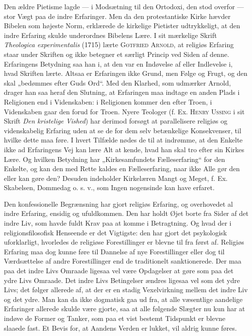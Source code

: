 \documentclass[12pt,a4paper,openany]{book}
\newcommand{\opage}[1]{\marginnote{\footnotesize\textit{[#1]}}}
\begin{document}
Den ældre Pietisme lagde --- i Modsætning til den Ortodoxi, den stod
overfor --- stor Vægt paa de indre Erfaringer. Men da den protestantiske
Kirke hævder Bibelen som højeste Norm, erklærede de kirkelige Pietister
udtrykkeligt, at den indre Erfaring skulde underordnes Bibelens Lære. I
sit mærkelige Skrift \textit{Theologica experimentalis} (1715) lærte
\textsc{Gotfried Arnold}, at religiøs Erfaring staar under Skriften og
ikke betegner et særligt Princip ved Siden af denne. Erfaringens
Betydning saa han i, at den var en Indøvelse af eller Indlevelse i, hvad
Skriften lærte. Altsaa er Erfaringen ikke Grund, men Følge og Frugt, og
den skal „bedømmes efter Guds Ord“. Med den Klarhed, som udmærker
Arnold, drager han saa heraf den Slutning, at Erfaringen maa indtage en
anden Plads i Religionen end i Videnskaben: i Religionen kommer den
efter Troen, i Videnskaben gaar den forud for Troen. Nyere Teologer (f.
Ex. \textsc{Henry Ussing} i sit Skrift \textit{Den kristelige Vished})
har derimod forsøgt at parallelisere religiøs og videnskabelig Erfaring
uden at se de for dem selv betænkelige Konsekvenser, til hvilke dette
maa føre. I hvert Tilfælde nødes de til at indrømme, at den Enkelte ikke
ad Erfaringens Vej kan lære Alt at kende, hvad han skal tro efter sin
Kirkes Lære. Og hvilken Betydning har „Kirkesamfundets Fælleserfaring“
for den Enkelte, og kan den med Rette kaldes en Fælleserfaring, naar
ikke Alle gør den eller kan gøre den? Desuden indeholder Kirkelæren
Mangt og Meget, f. Ex. Skabelsen, Dommedag o. s. v., som Ingen
nogensinde kan have erfaret.

Den konfessionelle Begrænsning har gjort religiøs Erfaring, og
overhovedet al indre Erfaring, ensidig og ufuldkommen. Den har holdt
Øjet borte fra Sider af det indre Liv, som havde fuldt Krav paa at komme
i Betragtning. Og hvad der i religionsfilosofisk Henseende er det
Vigtigste: den har gjort det psykologisk uforklarligt, hvorledes de
religiøse Forestillinger er blevne til fra først af. Religiøs Erfaring
maa dog kunne føre til Dannelse af nye Forestillinger eller dog til
Værdsættelse af andre Forestillinger end de traditionelt sanktionerede.
Der maa paa det indre Livs Omraade ligesaa vel være Opdagelser at gøre
som paa det ydre Livs Omraade. Det indre Livs Betingelser ændres ligesaa
vel som det ydre Livs; det følger allerede af, at der er en stadig
Vexelvirkning mellem det indre Liv og det ydre. Man kan da
\opage{61}ikke dogmatisk gaa ud fra, at alle væsentlige aandelige
Erfaringer allerede skulde være gjorte, saa at alle følgende Slægter nu
kun har at indøve de Former og Tanker, som paa et vist bestemt Tidspunkt
er blevne slaaede fast. Et Bevis for, at Aandens Verden er lukket, vil
aldrig kunne føres.
\end{document}
